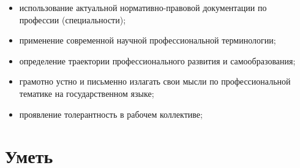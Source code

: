 \begin{itemize}
\item использование актуальной нормативно-правовой документации по \\ профессии (специальности);
\item применение современной научной профессиональной терминологии;
\item определение траектории профессионального развития и самообразования;
\item грамотно устно и письменно излагать свои мысли по профессиональной тематике на государственном языке;
\item проявление толерантность в рабочем коллективе;
\end{itemize}

\section*{Уметь}
